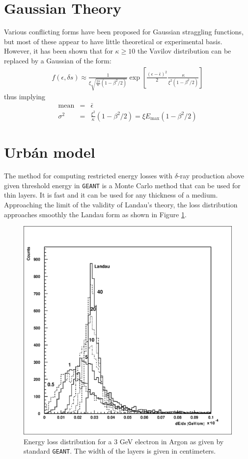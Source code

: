 \documentclass{article}
\newcommand{\Emax}{\ensuremath{E_{\mathrm{max}}}}
\newcommand{\GEANT}{\texttt{GEANT}}
\begin{document}
\section{Gaussian Theory}
 
Various conflicting forms have been proposed for Gaussian straggling
functions, but most of these appear to have little theoretical or
experimental basis.  However, it has been shown\cite{bib-SELT} that
for $\kappa \geq 10 $ the Vavilov distribution can be replaced by a
Gaussian of the form:
\begin{eqnarray*}
f( \epsilon , \delta s)  \approx \frac{1}
{\xi \sqrt{\frac{2 \pi}{\kappa} \left( 1 - \beta^2/2 \right)}}
   \exp \left [ \frac{( \epsilon - \bar{\epsilon} )^2}{2} \frac{\kappa}
   {\xi^2 (1- \beta^2/2)}\right ]
\end{eqnarray*}
thus implying 
\begin{eqnarray*}
\mathrm{mean} & = & \bar{\epsilon} \\
\sigma^2      & = & \frac{\xi^2}{\kappa} (1-\beta^2/2) = \xi
                    \Emax (1-\beta^2/2)
\end{eqnarray*}

\section{Urb\'an model}
\label{urban}

The method for computing restricted energy losses with $\delta$-ray
production above given threshold energy in \GEANT{} is a Monte
Carlo method that can be used for thin layers.  It is fast and it can
be used for any thickness of a medium.  Approaching the limit of the
validity of Landau's theory, the loss distribution approaches smoothly
the Landau form as shown in Figure \ref{fg:phys332-2}.
\begin{figure}
   \centering
   \includegraphics[width=.6\linewidth]{phys332-2}
   \caption{Energy loss distribution for a 3 GeV electron in
     Argon as given by standard \GEANT.  The width of the layers is
     given in centimeters.}
    \label{fg:phys332-2}
\end{figure}
\end{document}
